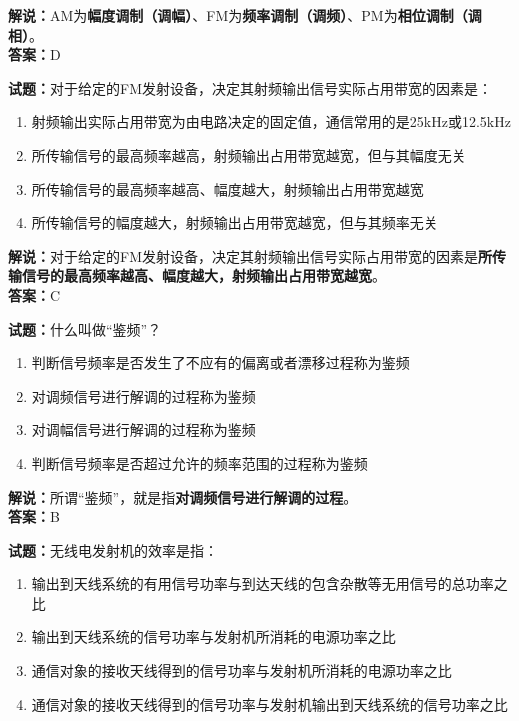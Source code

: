 \documentclass{ctexbook}
\begin{document}
\noindent\textbf{解说：}AM为\textbf{幅度调制（调幅）}、FM为\textbf{频率调制（调频）}、PM为\textbf{相位调制（调相）}。\\\noindent\textbf{答案：}D%


\bigskip


\noindent\textbf{试题：}对于给定的FM发射设备，决定其射频输出信号实际占用带宽的因素是：

\begin{enumerate}[leftmargin=3em]
	\item 射频输出实际占用带宽为由电路决定的固定值，通信常用的是25kHz或12.5kHz
	\item 所传输信号的最高频率越高，射频输出占用带宽越宽，但与其幅度无关
	\item 所传输信号的最高频率越高、幅度越大，射频输出占用带宽越宽
	\item 所传输信号的幅度越大，射频输出占用带宽越宽，但与其频率无关
\end{enumerate}

\noindent\textbf{解说：}对于给定的FM发射设备，决定其射频输出信号实际占用带宽的因素是\textbf{所传输信号的最高频率越高、幅度越大，射频输出占用带宽越宽}。\\\noindent\textbf{答案：}C%


\bigskip


\noindent\textbf{试题：}什么叫做“鉴频”？

\begin{enumerate}[leftmargin=3em]
	\item 判断信号频率是否发生了不应有的偏离或者漂移过程称为鉴频
	\item 对调频信号进行解调的过程称为鉴频
	\item 对调幅信号进行解调的过程称为鉴频
	\item 判断信号频率是否超过允许的频率范围的过程称为鉴频
\end{enumerate}

\noindent\textbf{解说：}所谓“鉴频”，就是指\textbf{对调频信号进行解调的过程}。\\\noindent\textbf{答案：}B


\bigskip


\noindent\textbf{试题：}无线电发射机的效率是指：

\begin{enumerate}[leftmargin=3em]
	\item 输出到天线系统的有用信号功率与到达天线的包含杂散等无用信号的总功率之比
	\item 输出到天线系统的信号功率与发射机所消耗的电源功率之比
	\item 通信对象的接收天线得到的信号功率与发射机所消耗的电源功率之比
	\item 通信对象的接收天线得到的信号功率与发射机输出到天线系统的信号功率之比
\end{enumerate}
\end{document}
